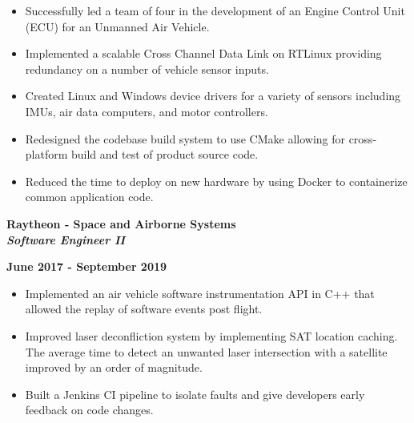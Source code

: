 \documentclass[10pt,letterpaper]{article}
\begin{document}
\begin{itemize}[noitemsep,topsep=0pt]
    \setlength\itemsep{0.2em}
    \item Successfully led a team of four in the development of an Engine
          Control Unit (ECU) for an Unmanned Air Vehicle.
    \item Implemented a scalable Cross Channel Data Link on RTLinux providing
          redundancy on a number of vehicle sensor inputs.
    \item Created Linux and Windows device drivers for a variety of sensors
          including IMUs, air data computers, and motor controllers.
    \item Redesigned the codebase build system to use CMake allowing for
          cross-platform build and test of product source code.
    \item Reduced the time to deploy on new hardware by using Docker to
          containerize common application code.
\end{itemize}

\medskip

\begin{minipage}[t]{0.53\textwidth}
    \begin{flushleft}
        \textbf{Raytheon - Space and Airborne Systems}\\
        \textbf{\textit{Software Engineer II}}\\
    \end{flushleft}
\end{minipage}
\begin{minipage}[t]{0.44\textwidth}
    \begin{flushright}
        \textbf{June 2017 - September 2019}
    \end{flushright}
\end{minipage}

\begin{itemize}[noitemsep,topsep=0pt]
    \setlength\itemsep{0.2em}
    \item Implemented an air vehicle software instrumentation API in C++
          that allowed the replay of software events post flight.
    \item Improved laser deconfliction system by implementing SAT location
          caching. The average time to detect an unwanted laser intersection
          with a satellite improved by an order of magnitude.
    \item Built a Jenkins CI pipeline to isolate faults and give developers
          early feedback on code changes.
\end{itemize}
\end{document}
